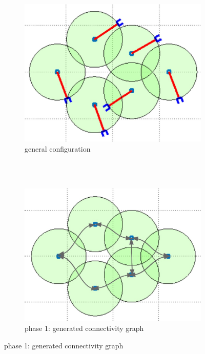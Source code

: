 \documentclass[english]{article}
\theoremstyle{definition}
\begin{document}
\begin{figure}[t]
    \centering
    \begin{subfigure}[b]{0.4\textwidth}
        \includegraphics[width=\textwidth]{general_configuration}
        \caption{general configuration \\ ~~}
        \label{fig:general_configuration}
    \end{subfigure}
    ~~~~
    \begin{subfigure}[b]{0.4\textwidth}
        \includegraphics[width=\textwidth]{generated_graph}
        \caption{phase 1: generated connectivity graph}
        \label{fig:connectivity_graph}
    \end{subfigure}  
    

\end{figure}
\end{document}
